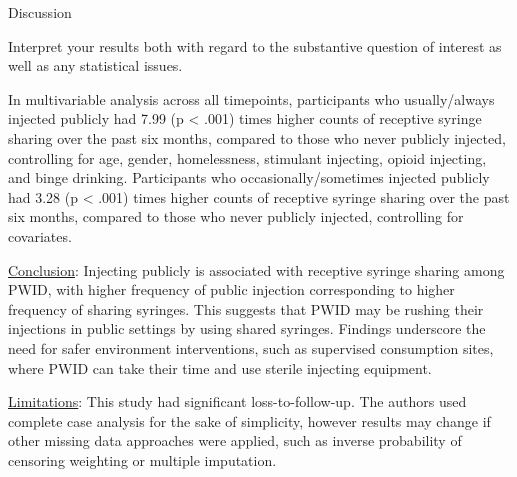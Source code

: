 \documentclass[ignorenonframetext,]{beamer}
\begin{document}
\begin{frame}{Discussion}

Interpret your results both with regard to the substantive question of
interest as well as any statistical issues.

In multivariable analysis across all timepoints, participants who
usually/always injected publicly had 7.99 (p \textless{} .001) times
higher counts of receptive syringe sharing over the past six months,
compared to those who never publicly injected, controlling for age,
gender, homelessness, stimulant injecting, opioid injecting, and binge
drinking. Participants who occasionally/sometimes injected publicly had
3.28 (p \textless{} .001) times higher counts of receptive syringe
sharing over the past six months, compared to those who never publicly
injected, controlling for covariates.

\underline{Conclusion}: Injecting publicly is associated with receptive
syringe sharing among PWID, with higher frequency of public injection
corresponding to higher frequency of sharing syringes. This suggests
that PWID may be rushing their injections in public settings by using
shared syringes. Findings underscore the need for safer environment
interventions, such as supervised consumption sites, where PWID can take
their time and use sterile injecting equipment.

\underline{Limitations}: This study had significant loss-to-follow-up.
The authors used complete case analysis for the sake of simplicity,
however results may change if other missing data approaches were
applied, such as inverse probability of censoring weighting or multiple
imputation.

\end{frame}
\end{document}
